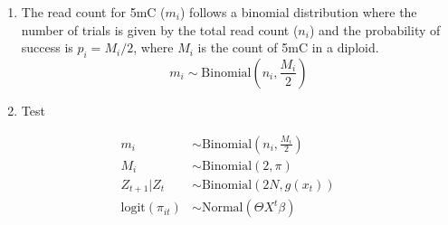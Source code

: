 \documentclass[preview]{standalone}
\begin{document}
\begin{enumerate}
\item The read count for 5mC ($m_i$) follows a binomial distribution
  where the number of trials is given by the total read count ($n_i$)
  and the probability of success is $p_i = M_i / 2$, where $M_i$ is
  the count of 5mC in a diploid.
  \begin{displaymath}
    m_i \sim \mathrm{Binomial}(n_i, \frac{M_i}{2})
  \end{displaymath}
\item Test
\end{enumerate}
\begin{align}
     m_i &\sim \mathrm{Binomial}(n_i, \frac{M_i}{2})
  \\ M_i &\sim \mathrm{Binomial}(2, \pi)
  \\ Z_{t+1}|Z_t &\sim \mathrm{Binomial}(2N, g(x_t))
  \\ \mathrm{logit}(\pi_{it}) &\sim \mathrm{Normal}(\Theta X^t\beta)
\end{align}
\end{document}
